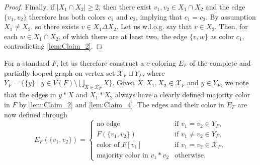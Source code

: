 \documentclass[a4paper,11pt]{article}
\numberwithin{equation}{section}
\newcommand{\mX}{\mathcal{X}}
\begin{document}
\begin{proof}
    \medskip
    
    Finally, if $|X_1\cap X_2| \ge 2$, then there exist $v_1, v_2 \in X_1\cap X_2$ and the edge $\{v_1, v_2\}$ therefore has both colors $c_1$ and $c_2$, implying that $c_1 = c_2$. By assumption $X_1 \neq X_2$, so there exists $v\in X_1\Delta X_2$. Let us w.l.o.g. say that $v\in X_2$. Then, for each $w \in X_1 \cap X_2$, of which there are at least two, the edge $\{v,w\}$ as color $c_1$, contradicting \cref{lem:Claim_2}.
\end{proof}


For a standard $F$, let us therefore construct
a $c$-coloring $E_F$ of the complete and partially looped graph on vertex set 
$\mX_F\sqcup Y_F$, where $Y_F= \{ \{y\} \mid y \in V(F)\setminus 
\bigcup_{X \in \mX_F} X\}$. Given $X, X_1, X_2 \in \mX_F$ and $y \in Y_F$, we note that the edges in $y \ast X$ and $X_1 \ast X_2$ always have a clearly defined majority color in $F$ by \cref{lem:Claim_2} and \cref{lem:Claim_4}. The edges and their color in $E_F$ are now defined through 
%
\begin{equation}\label{eq:def_of_looped_graph_E}
    E_F(\{v_1, v_2\}) = \left\{\begin{array}{lr}
        \text{no edge} & \text{if } v_1 = v_2 \in Y_F, \\
        F(\{v_1, v_2\}) & \text{if } v_1 \neq v_2 \in Y_F, \\
        \text{color of } F[v_1]  & \text{if } v_1 = v_2 \in \mX_F, \\
        \text{majority color in } v_1 \ast v_2 & \text{otherwise}. 
        \end{array}\right.
\end{equation}
\end{document}
